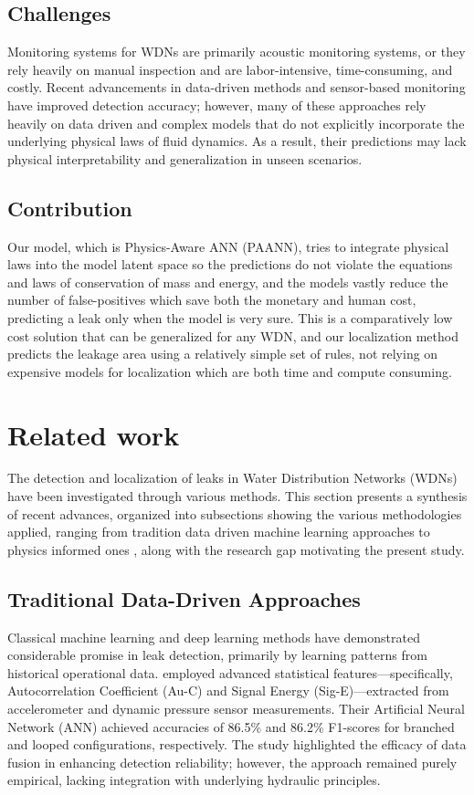 \documentclass[final,5p,times,twocolumn,authoryear]{elsarticle}
\begin{document}
\subsection{Challenges}
Monitoring systems for WDNs are primarily acoustic monitoring systems, or they rely heavily on manual inspection and are labor-intensive, time-consuming, and costly. Recent advancements in data-driven methods and sensor-based monitoring have improved detection accuracy; however, many of these approaches rely heavily on data driven and complex models that do not explicitly incorporate the underlying physical laws of fluid dynamics. As a result, their predictions may lack physical interpretability and generalization in unseen scenarios.

\subsection{Contribution}
Our model, which is Physics-Aware ANN (PAANN), tries to integrate physical laws into the model latent space so the predictions do not violate the equations and laws of conservation of mass and energy, and the models vastly reduce the number of false-positives which save both the monetary and human cost, predicting a leak only when the model is very sure. This is a comparatively low cost solution that can be generalized for any WDN, and our localization method predicts the leakage area using a relatively simple set of rules, not relying on expensive models for localization which are both time and compute consuming.

\section{Related work}

The detection and localization of leaks in Water Distribution Networks (WDNs) have been
 investigated through various methods. This section presents a  synthesis of recent advances, organized into subsections showing the various methodologies applied, ranging from tradition data driven machine learning approaches to physics informed ones , along with the research gap motivating the present study.

\subsection{Traditional Data-Driven Approaches}

Classical machine learning and deep learning methods have demonstrated considerable promise in leak detection, primarily by learning patterns from historical operational data. \cite{MAHDI2024100685} employed advanced statistical features—specifically, Autocorrelation Coefficient (Au-C) and Signal Energy (Sig-E)—extracted from accelerometer and dynamic pressure sensor measurements. Their Artificial Neural Network (ANN) achieved accuracies of 86.5\% and 86.2\% F1-scores for branched and looped configurations, respectively. The study highlighted the efficacy of data fusion in enhancing detection reliability; however, the approach remained purely empirical, lacking integration with underlying hydraulic principles.
\end{document}
